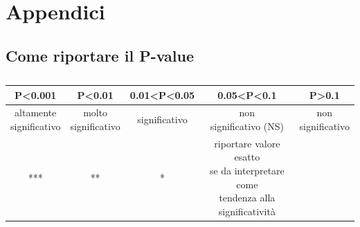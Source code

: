\documentclass[10pt, draft]{book}
\begin{document}

\chapter{Appendici}

\section{Come riportare il P-value}

\begin{table}[H]
    \centering
    \renewcommand\arraystretch{1.2}
    \begin{tabular}{c|c|c|c|c}
    \hline
    \textbf{P<0.001} & \textbf{P<0.01} & \textbf{0.01<P<0.05} & \textbf{0.05<P<0.1} & \textbf{P>0.1}\\
    \hline
    \makecell{altamente\\significativo} & \makecell{molto\\significativo} & significativo & \makecell{non\\significativo (NS)} & \makecell{non\\significativo}\\
    \hline
    *** & ** & * & \makecell{riportare valore esatto\\se da interpretare come\\tendenza alla significatività}\\
    \hline
    \end{tabular}
    \caption{\small{}}
    \label{tabpvalue}
\end{table}\noindent
\end{document}
